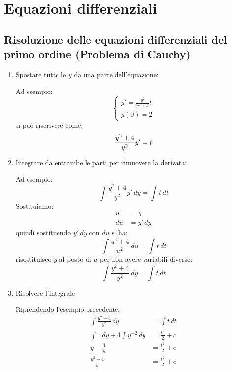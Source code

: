 \documentclass{article}
\begin{document}
\tableofcontents
\pagebreak

\section{Equazioni differenziali}

\subsection{Risoluzione delle equazioni differenziali  del primo ordine (Problema di Cauchy)}
\begin{enumerate}
  \item Spostare tutte le \( y \) da una parte dell'equazione:
    \begin{example}
      Ad esempio:
      \[
        \begin{cases}
          y' = \frac{y ^2}{y ^2 + 4}t\\
          y(0) = 2
        \end{cases}
      \]
      si può riscrivere come:
      \[
        \frac{y ^2 + 4}{y ^2}y' = t\\
      \]
    \end{example}

  \item Integrare da entrambe le parti per rimuovere la derivata:
    \begin{example}
      Ad esempio:
      \[
        \int \frac{y ^2 + 4}{y ^2}y' \, dy = \int t \, dt
      \]
      Sostituiamo:
      \[
        \begin{aligned}
          u &= y\\
          du &= y' \, dy
        \end{aligned}
      \] 
      quindi sostituendo \( y' \, dy \) con \( du \) si ha:
      \[
        \int \frac{u ^2 + 4}{u ^2} \, du = \int t \, dt
      \]
      risostituisco \( y \) al posto di \( u \) per non avere variabili diverse:
      \[
        \int \frac{y ^2 + 4}{y ^2} \, dy = \int t \, dt
      \]
    \end{example}

  \item Risolvere l'integrale
    \begin{example}
      Riprendendo l'esempio precedente:
      \[
        \begin{aligned}
          \int \frac{y ^2 + 4}{y ^2} \, dy &= \int t \, dt \\
          \int 1 \, dy + 4 \int y^{-2} \, dy &= \frac{t^2}{2} + c\\
          y - \frac{4}{y} &= \frac{t^2}{2} + c\\
          \frac{y^2 - 4}{y} &= \frac{t^2}{2} + c\\
        \end{aligned}
      \] 
    \end{example}


\end{enumerate}
\end{document}

